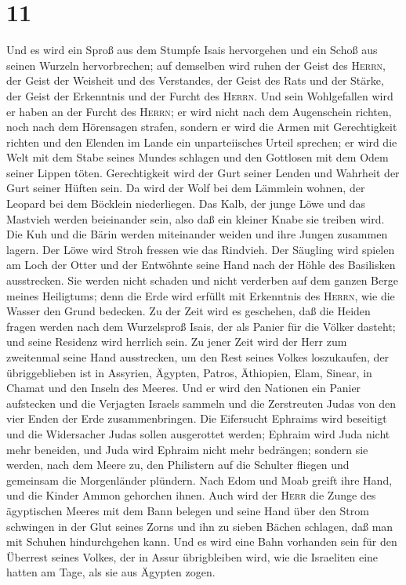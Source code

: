 \hypertarget{section-10}{%
\section{11}\label{section-10}}

 Und es wird ein Sproß aus dem Stumpfe Isais hervorgehen
und ein Schoß aus seinen Wurzeln hervorbrechen;  auf
demselben wird ruhen der Geist des \textsc{Herrn}, der Geist der
Weisheit und des Verstandes, der Geist des Rats und der Stärke, der
Geist der Erkenntnis und der Furcht des \textsc{Herrn}. 
Und sein Wohlgefallen wird er haben an der Furcht des \textsc{Herrn}; er
wird nicht nach dem Augenschein richten, noch nach dem Hörensagen
strafen,  sondern er wird die Armen mit Gerechtigkeit
richten und den Elenden im Lande ein unparteiisches Urteil sprechen; er
wird die Welt mit dem Stabe seines Mundes schlagen und den Gottlosen mit
dem Odem seiner Lippen töten.  Gerechtigkeit wird der Gurt
seiner Lenden und Wahrheit der Gurt seiner Hüften sein. 
Da wird der Wolf bei dem Lämmlein wohnen, der Leopard bei dem Böcklein
niederliegen. Das Kalb, der junge Löwe und das Mastvieh werden
beieinander sein, also daß ein kleiner Knabe sie treiben wird.
 Die Kuh und die Bärin werden miteinander weiden und ihre
Jungen zusammen lagern. Der Löwe wird Stroh fressen wie das Rindvieh.
 Der Säugling wird spielen am Loch der Otter und der
Entwöhnte seine Hand nach der Höhle des Basilisken ausstrecken.
 Sie werden nicht schaden und nicht verderben auf dem
ganzen Berge meines Heiligtums; denn die Erde wird erfüllt mit
Erkenntnis des \textsc{Herrn}, wie die Wasser den Grund bedecken.
 Zu der Zeit wird es geschehen, daß die Heiden fragen
werden nach dem Wurzelsproß Isais, der als Panier für die Völker
dasteht; und seine Residenz wird herrlich sein.  Zu jener
Zeit wird der Herr zum zweitenmal seine Hand ausstrecken, um den Rest
seines Volkes loszukaufen, der übriggeblieben ist in Assyrien, Ägypten,
Patros, Äthiopien, Elam, Sinear, in Chamat und den Inseln des Meeres.
 Und er wird den Nationen ein Panier aufstecken und die
Verjagten Israels sammeln und die Zerstreuten Judas von den vier Enden
der Erde zusammenbringen.  Die Eifersucht Ephraims wird
beseitigt und die Widersacher Judas sollen ausgerottet werden; Ephraim
wird Juda nicht mehr beneiden, und Juda wird Ephraim nicht mehr
bedrängen;  sondern sie werden, nach dem Meere zu, den
Philistern auf die Schulter fliegen und gemeinsam die Morgenländer
plündern. Nach Edom und Moab greift ihre Hand, und die Kinder Ammon
gehorchen ihnen.  Auch wird der \textsc{Herr} die Zunge
des ägyptischen Meeres mit dem Bann belegen und seine Hand über den
Strom schwingen in der Glut seines Zorns und ihn zu sieben Bächen
schlagen, daß man mit Schuhen hindurchgehen kann.  Und es
wird eine Bahn vorhanden sein für den Überrest seines Volkes, der in
Assur übrigbleiben wird, wie die Israeliten eine hatten am Tage, als sie
aus Ägypten zogen.

